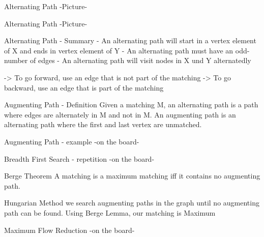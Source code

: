 \begin{frame}{Alternating Path}
-Picture-
  
\end{frame}

\begin{frame}{Alternating Path}
-Picture-
  
\end{frame}

\begin{frame}{Alternating Path - Summary}
- An alternating path will start in a vertex element of X and ends in vertex element of Y
- An alternating path must have an odd-number of edges
- An alternating path will visit nodes in X und Y alternatedly

-> To go forward, use an edge that is not part of the matching
-> To go backward, use an edge that is part of the matching
  
\end{frame}

\begin{frame}{Augmenting Path - Definition}
Given a matching M, an alternating path is a path where edges are alternately in M and not in M. An augmenting path is an alternating path where the first and last vertex are unmatched.
  
\end{frame}

\begin{frame}{Augmenting Path - example}
-on the board-
  
\end{frame}

\begin{frame}{Breadth First Search - repetition}
-on the board-
  
\end{frame}

\begin{frame}{Berge Theorem}
A matching is a maximum matching iff it contains no augmenting path.
  
\end{frame}

\begin{frame}{Hungarian Method}
we search augmenting paths in the graph until no augmenting path can be found. Using Berge Lemma, our matching is Maximum
\end{frame}

\begin{frame}{Maximum Flow Reduction}
-on the board-
  
\end{frame}

